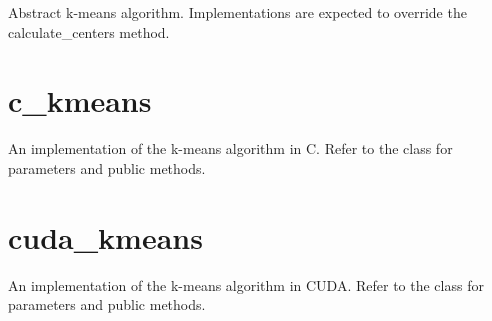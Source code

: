 \documentclass[letterpaper,10pt,english]{sphinxmanual}
\begin{document}

\begin{fulllineitems}
\label{kmeans:kmeans.Kmeans}
Abstract k-means algorithm. Implementations are expected to override the calculate\_centers method.

\end{fulllineitems}



\section{c\_kmeans}
\label{kmeans:module-extension.c_kmeans}\label{kmeans:c-kmeans}

\begin{fulllineitems}
\label{kmeans:extension.c_kmeans.CKmeans}
An implementation of the k-means algorithm in C. Refer to the {\hyperref[kmeans:kmeans.DefaultKmeans]{}} class for parameters and
public methods.

\end{fulllineitems}



\section{cuda\_kmeans}
\label{kmeans:cuda-kmeans}

\begin{fulllineitems}
\label{kmeans:extension.c_kmeans.cuda.cuda_kmeans.CUDAKmeans}
An implementation of the k-means algorithm in CUDA. Refer to the {\hyperref[kmeans:kmeans.DefaultKmeans]{}} class for parameters and
public methods.

\end{fulllineitems}
\end{document}

